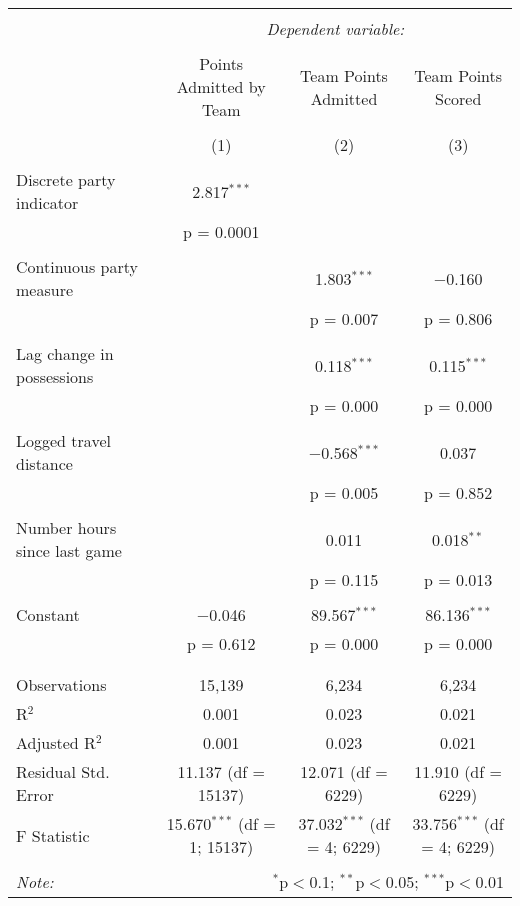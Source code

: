 \documentclass[letterpaper,12pt]{article}
\begin{document}
\hspace{-100pt}
\begin{tabular}{@{\extracolsep{5pt}}lccc}  \\[-1.8ex]\hline  \hline \\[-1.8ex]   & \multicolumn{3}{c}{\textit{Dependent variable:}} \\  \cline{2-4}  \\[-1.8ex] & Points Admitted by Team & Team Points Admitted & Team Points Scored \\  \\[-1.8ex] & (1) & (2) & (3)\\  \hline \\[-1.8ex]   Discrete party indicator & 2.817$^{***}$ &  &  \\    & p = 0.0001 &  &  \\    & & & \\   Continuous party measure &  & 1.803$^{***}$ & $-$0.160 \\    &  & p = 0.007 & p = 0.806 \\    & & & \\   Lag change in possessions &  & 0.118$^{***}$ & 0.115$^{***}$ \\    &  & p = 0.000 & p = 0.000 \\    & & & \\   Logged travel distance &  & $-$0.568$^{***}$ & 0.037 \\    &  & p = 0.005 & p = 0.852 \\    & & & \\   Number hours since last game &  & 0.011 & 0.018$^{**}$ \\    &  & p = 0.115 & p = 0.013 \\    & & & \\   Constant & $-$0.046 & 89.567$^{***}$ & 86.136$^{***}$ \\    & p = 0.612 & p = 0.000 & p = 0.000 \\    & & & \\  \hline \\[-1.8ex]  Observations & 15,139 & 6,234 & 6,234 \\  R$^{2}$ & 0.001 & 0.023 & 0.021 \\  Adjusted R$^{2}$ & 0.001 & 0.023 & 0.021 \\  Residual Std. Error & 11.137 (df = 15137) & 12.071 (df = 6229) & 11.910 (df = 6229) \\  F Statistic & 15.670$^{***}$ (df = 1; 15137) & 37.032$^{***}$ (df = 4; 6229) & 33.756$^{***}$ (df = 4; 6229) \\  \hline  \hline \\[-1.8ex]  \textit{Note:}  & \multicolumn{3}{r}{$^{*}$p$<$0.1; $^{**}$p$<$0.05; $^{***}$p$<$0.01} \\  \end{tabular}  
\end{document}
